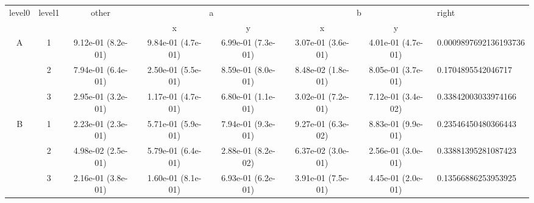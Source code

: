 \begin{tabular}{cccccccl}
\toprule
\multirow{2}{*}{level0} & \multirow{2}{*}{level1}& \multirow{2}{*}{other}&\multicolumn{2}{c}{a}&\multicolumn{2}{c}{b}& \multirow{2}{*}{right}\tabularnewline
\cmidrule(lr){4-5}
\cmidrule(lr){6-7}
&&&x&y&x&y\tabularnewline
\midrule
\multirow{3}{*}{A}&1& 9.12e-01 (8.2e-01)& 9.84e-01 (4.7e-01)& 6.99e-01 (7.3e-01)& 3.07e-01 (3.6e-01)& 4.01e-01 (4.7e-01)& 0.0009897692136193736\tabularnewline
&2& 7.94e-01 (6.4e-01)& 2.50e-01 (5.5e-01)& 8.59e-01 (8.0e-01)& 8.48e-02 (1.8e-01)& 8.05e-01 (3.7e-01)& 0.1704895542046717\tabularnewline
&3& 2.95e-01 (3.2e-01)& 1.17e-01 (4.7e-01)& 6.80e-01 (1.1e-01)& 3.02e-01 (7.2e-01)& 7.12e-01 (3.4e-02)& 0.33842003033974166\tabularnewline
\midrule
\multirow{3}{*}{B}&1& 2.23e-01 (2.3e-01)& 5.71e-01 (5.9e-01)& 7.94e-01 (9.3e-01)& 9.27e-01 (6.3e-02)& 8.83e-01 (9.9e-01)& 0.23546450480366443\tabularnewline
&2& 4.98e-02 (2.5e-01)& 5.79e-01 (6.4e-01)& 2.88e-01 (8.2e-02)& 6.37e-02 (3.0e-01)& 2.56e-01 (3.0e-01)& 0.33881395281087423\tabularnewline
&3& 2.16e-01 (3.8e-01)& 1.60e-01 (8.1e-01)& 6.93e-01 (6.2e-01)& 3.91e-01 (7.5e-01)& 4.45e-01 (2.0e-01)& 0.13566886253953925\tabularnewline
\bottomrule
\end{tabular}
